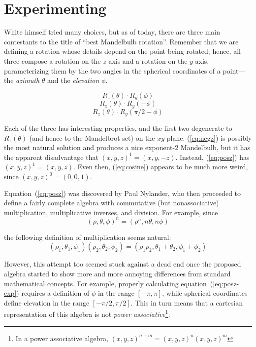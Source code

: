 \documentclass{article}
\begin{document}
\section{Experimenting}
\label{sec:experimenting}

White himself tried many choices, but as of today, there are three
main contestants to the title of ``best Mandelbulb rotation''.
Remember that we are defining a rotation whose details depend on the
point being rotated; hence, all three compose a rotation on the $z$ axis
and a rotation on the $y$ axis, parameterizing them by the two angles in
the spherical coordinates of a point---the \emph{azimuth} $\theta$ and
the \emph{elevation} $\phi$.

\begin{equation}
\label{eq:negz}
  R_z(\theta) \cdot R_y(\phi)
\end{equation}
\begin{equation}
\label{eq:posz}
  R_z(\theta) \cdot R_y(-\phi)
\end{equation}
\begin{equation}
\label{eq:cosine}
  R_z(\theta) \cdot R_y(\pi/2-\phi)
\end{equation}

Each of the three has interesting properties, and the first two
degenerate to $R_z(\theta)$ (and hence to the Mandelbrot set) on the
$xy$ plane.  (\ref{eq:negz}) is possibly the most natural solution and
produces a nice exponent-2 Mandelbulb, but it has the apparent
disadvantage that $(x,y,z)^1=(x,y,-z)$.  Instead, (\ref{eq:posz}) has
$(x,y,z)^1=(x,y,z)$.  Even then, (\ref{eq:cosine}) appears to be
much more weird, since $(x,y,z)^0=(0,0,1)$.

Equation~(\ref{eq:posz}) was discovered by Paul Nylander, who then proceeded to
define a fairly complete algebra with commutative (but nonassociative)
multiplication, multiplicative inverses, and division.  For example,
since
\begin{equation}
  \label{eq:posz-exp}
  (\rho,\theta,\phi)^n=(\rho^n, n\theta, n\phi)
\end{equation}

\noindent
the following definition of multiplication seems natural:
\begin{equation*}
  (\rho_1,\theta_1,\phi_1) (\rho_2,\theta_2,\phi_2)=
  (\rho_1 \rho_2,\theta_1+\theta_2,\phi_1+\phi_2)
\end{equation*}

\noindent
However, this attempt too seemed stuck against a dead end once the
proposed algebra started to show more and more annoying differences
from standard mathematical concepts.  For example, properly
calculating equation~(\ref{eq:posz-exp}) requires a definition of
$\phi$ in the range $[-\pi,\pi]$, while spherical coordinates define
elevation in the range $[-\pi/2,\pi/2]$.  This in turn means that a
cartesian representation of this algebra is not \emph{power
  associative}\footnote{In a power associative algebra, $(x,y,z)^{n+m}
  = (x,y,z)^n (x,y,z)^m$}.
\end{document}
